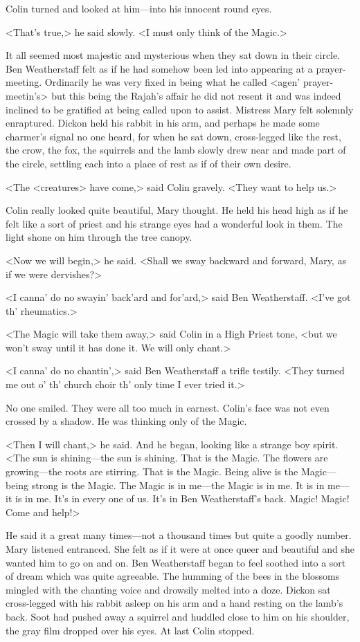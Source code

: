 Colin turned and looked at him—into his innocent round eyes.

<That's true,> he said slowly. <I must only think of the Magic.>

It all seemed most majestic and mysterious when they sat down in their circle. Ben Weatherstaff felt as if he had somehow been led into appearing at a prayer-meeting. Ordinarily he was very fixed in being what he called <agen' prayer-meetin's> but this being the Rajah's affair he did not resent it and was indeed inclined to be gratified at being called upon to assist. Mistress Mary felt solemnly enraptured. Dickon held his rabbit in his arm, and perhaps he made some charmer's signal no one heard, for when he sat down, cross-legged like the rest, the crow, the fox, the squirrels and the lamb slowly drew near and made part of the circle, settling each into a place of rest as if of their own desire.

<The <creatures> have come,> said Colin gravely. <They want to help us.>

Colin really looked quite beautiful, Mary thought. He held his head high as if he felt like a sort of priest and his strange eyes had a wonderful look in them. The light shone on him through the tree canopy.

<Now we will begin,> he said. <Shall we sway backward and forward, Mary, as if we were dervishes?>

<I canna' do no swayin' back'ard and for'ard,> said Ben Weatherstaff. <I've got th' rheumatics.>

<The Magic will take them away,> said Colin in a High Priest tone, <but we won't sway until it has done it. We will only chant.>

<I canna' do no chantin',> said Ben Weatherstaff a trifle testily. <They turned me out o' th' church choir th' only time I ever tried it.>

No one smiled. They were all too much in earnest. Colin's face was not even crossed by a shadow. He was thinking only of the Magic.

<Then I will chant,> he said. And he began, looking like a strange boy spirit. <The sun is shining—the sun is shining. That is the Magic. The flowers are growing—the roots are stirring. That is the Magic. Being alive is the Magic—being strong is the Magic. The Magic is in me—the Magic is in me. It is in me—it is in me. It's in every one of us. It's in Ben Weatherstaff's back. Magic! Magic! Come and help!>

He said it a great many times—not a thousand times but quite a goodly number. Mary listened entranced. She felt as if it were at once queer and beautiful and she wanted him to go on and on. Ben Weatherstaff began to feel soothed into a sort of dream which was quite agreeable. The humming of the bees in the blossoms mingled with the chanting voice and drowsily melted into a doze. Dickon sat cross-legged with his rabbit asleep on his arm and a hand resting on the lamb's back. Soot had pushed away a squirrel and huddled close to him on his shoulder, the gray film dropped over his eyes. At last Colin stopped.

